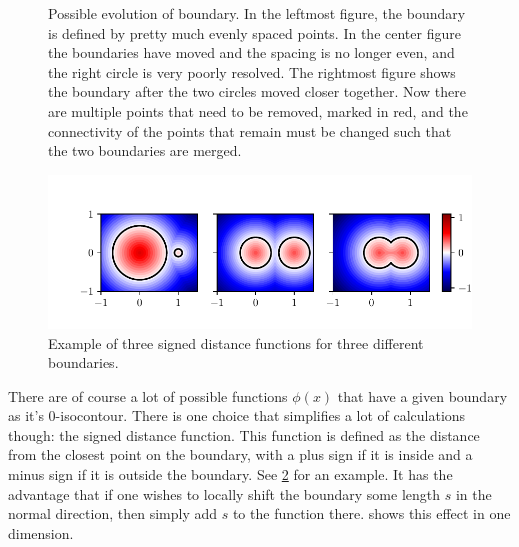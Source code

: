 \begin{figure}[htpb]
	\centering
	
	\caption{%
		Possible evolution of boundary. In the leftmost figure, the
		boundary is defined by pretty much evenly spaced points. In the center figure
		the boundaries have moved and the spacing is no longer even, and the
		right circle is very poorly resolved.
		The rightmost figure shows the boundary after the two circles moved
		closer together. Now there are multiple points that need to be removed,
		marked in red, and the connectivity of the points that remain must be
		changed such that the two boundaries are merged.
	}%
	\label{fig:direct_troubles}
\end{figure}
\begin{figure}[htpb]
	\centering
	\includegraphics{chapters/methods/signed_dist_example.pdf}
	\caption{%
		Example of three signed distance functions for three different
		boundaries.
	}%
	\label{fig:signed_dist_example}
\end{figure}

There are of course a lot of possible functions $\phi(x)$ that have a given
boundary as it's 0-isocontour.
There is one choice that simplifies a lot of calculations though: the signed
distance function.
This function is defined as the distance from the closest point on the boundary,
with a plus sign if it is inside and a minus sign if it is outside the boundary.
See \cref{fig:signed_dist_example} for an example.
It has the advantage that if one wishes to locally shift the boundary some
length $s$ in the normal direction, then simply add $s$ to the function there.
 shows this effect in one dimension.

